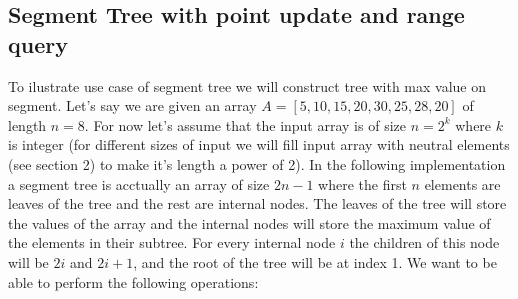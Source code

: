 \documentclass{article}
\begin{document}
\subsection{Segment Tree with point update and range query}
To ilustrate use case of segment tree we will construct tree with max value on segment.
Let's say we are given an array \(A = [5, 10, 15, 20, 30, 25, 28, 20]\) of length \(n = 8\).
For now let's assume that the input array is of size \(n = 2^{k}\) where \(k\) is integer (for different
sizes of input we will fill input array with neutral elements (see section 2) to make it's length a power of 2).
In the following implementation a segment tree is acctually an array of size \(2n - 1\) where the first \(n\) elements are leaves of the tree and the rest are internal nodes.
The leaves of the tree will store the values of the array and the internal nodes will store the maximum value of the elements in their subtree.
For every internal node \(i\) the children of this node will be \(2i\) and \(2i + 1\), and the root of the tree will be at index 1.
We want to be able to perform the following operations:
\end{document}
